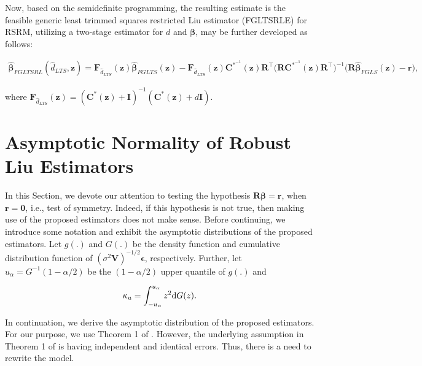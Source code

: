 \documentclass[10pt,twoside]{article}
\numberwithin{equation}{section}
\begin{document}
Now, based on the semidefinite programming, the resulting estimate is the feasible generic least trimmed squares restricted Liu estimator (FGLTSRLE) for RSRM, utilizing a two-stage estimator for $d$ and $\boldsymbol\beta$, may be further developed as follows:

\begin{eqnarray}\label{eq25}

\hat{\boldsymbol\beta}_{FGLTSRL}(\hat d_{LTS},\boldsymbol z)=\boldsymbol F_{\hat d_{LTS}}(\boldsymbol z)\hat{\boldsymbol\beta}_{FGLTS}(\boldsymbol z)-\boldsymbol F_{\hat d_{LTS}}(\boldsymbol z)\boldsymbol C^{*^{-1}}(\boldsymbol z)\boldsymbol R^\top\big(\boldsymbol R\boldsymbol C^{*^{-1}}(\boldsymbol z)\boldsymbol R^{\top}\big)^{-1}\big(\boldsymbol R\hat{\boldsymbol\beta}_{FGLS}(\boldsymbol z)-\boldsymbol r\big),

\end{eqnarray}

where $\boldsymbol F_{\hat d_{LTS}}(\boldsymbol z)=(\boldsymbol C^{*}(\boldsymbol z)+\boldsymbol I)^{-1}(\boldsymbol C^{*}(\boldsymbol z)+d\boldsymbol I)$.



\section{ Asymptotic Normality of Robust Liu Estimators}



In this Section, we devote our attention to testing the hypothesis $\boldsymbol{R}\boldsymbol{\beta}=\boldsymbol{r}$, when $\boldsymbol{r}=\boldsymbol{0}$, i.e., test of symmetry. Indeed, if this hypothesis is not true, then making use of the proposed estimators does not make sense. Before continuing, we introduce some notation and exhibit the asymptotic distributions of the proposed estimators. Let $g(.)$ and $G(.)$ be the density function and cumulative distribution function of $(\sigma^2\boldsymbol{V})^{-1/2}\boldsymbol{\epsilon}$, respectively. Further, let $u_\alpha=G^{-1}(1-\alpha/2)$ be the $(1-\alpha/2)$ upper quantile of $g(.)$ and

\begin{equation*}

\kappa_u=\int_{-u_\alpha}^{u_\alpha} z^2\textnormal{d}G(z).

\end{equation*}



In continuation, we derive the asymptotic distribution of the proposed estimators. For our purpose, we use Theorem 1 of \cite{v2006}. However, the underlying assumption in Theorem 1 of \cite{v2006} is having independent and identical errors. Thus, there is a need to rewrite the model.
\end{document}
